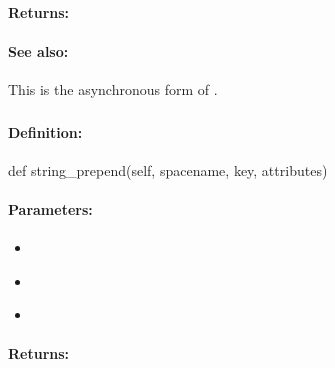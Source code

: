 \paragraph{Returns:}


\paragraph{See also:}  This is the asynchronous form of .

\pagebreak
\subsubsection{}
\label{api:python:string_prepend}


\paragraph{Definition:}
\begin{pythoncode}
def string_prepend(self, spacename, key, attributes)
\end{pythoncode}

\paragraph{Parameters:}
\begin{itemize}[noitemsep]
\item {}\\

\item {}\\

\item {}\\

\end{itemize}

\paragraph{Returns:}


\pagebreak
\subsubsection{}
\label{api:python:async_string_prepend}


